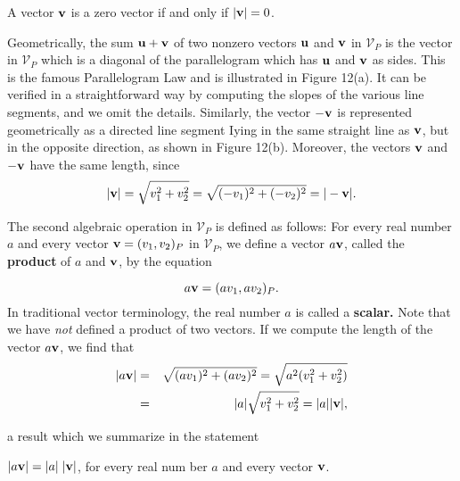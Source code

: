 \begin{theorem} A vector $\mbox{\bf{v}}$ is a zero vector if and only if $|\mbox{\bf{v}}| = 0$.
\end{theorem} 

Geometrically, the sum $\mbox{\bf{u}} + \mbox{\bf{v}}$ of two nonzero vectors $\mbox{\bf{u}}$ and $\mbox{\bf{v}}$ in $\mathcal{V}_P$ is the vector in $\mathcal{V}_P$ which is a diagonal of the parallelogram which has $\mbox{\bf{u}}$ and $\mbox{\bf{v}}$ as sides. This is the famous Parallelogram Law and is illustrated in Figure 12(a). It can be verified in a straightforward way by computing the slopes of the various line segments, and we omit the details. Similarly, the vector $-\mbox{\bf{v}}$ is represented geometrically as a directed line segment Iying in the
same straight line as $\mbox{\bf{v}}$, but in the opposite direction, as shown in Figure 12(b). Moreover, the vectors $\mbox{\bf{v}}$ and $-\mbox{\bf{v}}$ have the same length, since
$$
|\mbox{\bf{v}}| = \sqrt{v_1^2+v_2^2} = \sqrt{(-v_1)^2 + (-v_2)^2} = 
|- \mbox{\bf{v}}|.
$$

The second algebraic operation in $\mathcal{V}_P$ is defined as follows: For every real number $a$ and every vector $\mbox{\bf{v}} = (v_1, v_2)_P$ in $\mathcal{V}_P$, we define a vector $a\mbox{\bf{v}}$, called the \textbf{product} of $a$ and $\mbox{\bf{v}}$, by the equation

\begin{equation}
 a\mbox{\bf{v}} = (av_1, av_2)_P .  
\label{eq10.3.5}
\end{equation}
\noindent In traditional vector terminology, the real number $a$ is called a \textbf{scalar.} Note that we have \textit{not} defined a product of two vectors. If we compute the length of the vector $a\mbox{\bf{v}}$, we find that
\begin{eqnarray*}
|a\mbox{\bf{v}}| &=& \sqrt{(av_1)^2 + (av_2)^2} = \sqrt{a^2(v_1^2 + v_2^2)}\\
&=& |a| \sqrt{v_1^2 + v_2^2}  = |a| |\mbox{\bf{v}}|, 
\end{eqnarray*}

\noindent a result which we summarize in the statement

\begin{theorem} $|a\mbox{\bf{v}}| = |a| \; |\mbox{\bf{v}}|$, for every real num ber $a$ and every vector $\mbox{\bf{v}}$.
\end{theorem}

